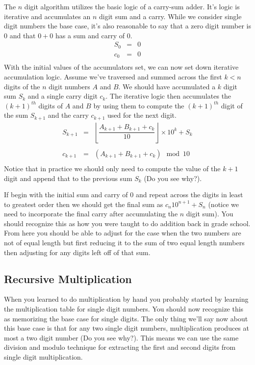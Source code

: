 \documentclass[10pt]{article}
\begin{document}
The $n$ digit algorithm utilizes the basic logic of a carry-sum adder. It's logic is iterative and accumulates an $n$ digit sum and a carry. While we consider single digit numbers the base case, it's also reasonable to say that a zero digit number is $0$ and that $0+0$ has a sum and carry of $0$.
\[
\begin{array}{rcl}
S_{0} &=& 0 \\
c_{0} &=& 0 \\
\end{array}
\]
With the initial values of the accumulators set, we can now set down iterative accumulation logic. Assume we've traversed and summed across the first $k < n$ digits of the $n$ digit numbers $A$ and $B$. We should have accumulated a $k$ digit sum $S_k$ and a single carry digit $c_k$. The iterative logic then accumulates the ${(k+1)}^{th}$ digits of $A$ and $B$ by using them to compute the ${(k+1)}^{th}$ digit of the sum $S_{k+1}$ and the carry $c_{k+1}$ used for the next digit.
\[
\begin{array}{rcl}
S_{k+1} &=& \left\lfloor \dfrac{A_{k+1} + B_{k+1} + c_k}{10} \right\rfloor\times10^k + S_k \\ \\
c_{k+1} &=& (A_{k+1} + B_{k+1} + c_k) \mod 10 \\
\end{array}
\]
Notice that in practice we should only need to compute the value of the $k+1$ digit and append that to the previous sum $S_k$ (Do you see why?).

If begin with the initial sum and carry of $0$ and repeat across the digits in least to greatest order then we should get the final sum as $c_n10^{n+1}+S_n$ (notice we need to incorporate the final carry after accumulating the $n$ digit sum). You should recognize this as how you were taught to do addition back in grade school. From here you should be able to adjust for the case when the two numbers are not of equal length but first reducing it to the sum of two equal length numbers then adjusting for any digits left off of that sum.

\subsection*{Recursive Multiplication}

When you learned to do multiplication by hand you probably started by learning the multiplication table for single digit numbers. You should now recognize this as memorizing the base case for single digits. The only thing we'll say now about this base case is that for any two single digit numbers, multiplication produces at most a two digit number (Do you see why?). This means we can use the same division and modulo technique for extracting the first and second digits from single digit multiplication.
\end{document}
